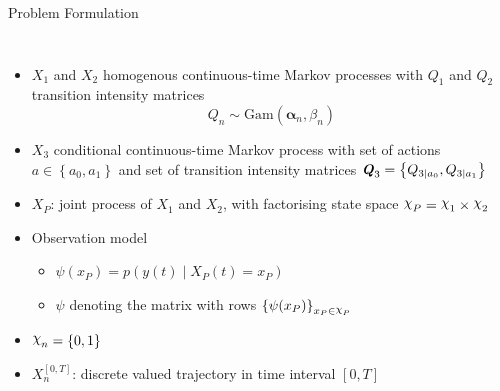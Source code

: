 \documentclass[
english,%
aspectratio=169,%
color={accentcolor=3b},
logo=true,%
colorframetitle=false,%
]{tudabeamer}
\DeclareRobustCommand{\rchi}{{\mathpalette\irchi\relax}}
\newcommand{\irchi}[2]{\raisebox{\depth}{$#1\chi$}}
\begin{document}
\begin{frame}{Problem Formulation}
\begin{columns}[onlytextwidth,c]
{
}
\begin{itemize}
	\item $ X_{1} $ and $ X_{2} $ homogenous continuous-time Markov processes with $ Q_{1} $ and $ Q_{2} $ transition intensity matrices
	\vspace{-5pt}
	\begin{equation}
	Q_{n} \sim \mathrm{Gam}(\boldsymbol{\alpha}_{n}, \beta_{n})
	\end{equation}
	\item $X_{3} $ conditional continuous-time Markov process  with set of actions $ a \in \left\lbrace a_{0}, a_{1}\right\rbrace  $ and set of transition intensity matrices $ \textbf{\textit{Q}}_{3} = \left\lbrace Q_{3\mid a_{0}}, Q_{3\mid a_{1}} \right\rbrace  $
	\item $ X_P $: joint process of $ X_1 $ and $ X_2 $, with factorising state space $ \rchi_{P} = \rchi_1 \times \rchi_2 $
	\item Observation model
	\begin{itemize}
		\item $ \psi(x_P) = p(y(t) \mid X_{P}(t)=x_P) $
		\vspace{5pt}
		\item $ \psi $ denoting the matrix with rows $ \left\lbrace \psi(x_P)\right\rbrace_{x_P \in \rchi_P} $
	\end{itemize}
	\item $ \rchi_{n} = \left\lbrace 0,1\right\rbrace $
	\item $ X_{n}^{[0,T]} $: discrete valued trajectory in time interval $ [0, T] $
\end{itemize}
\end{columns}
\end{frame}
\end{document}
